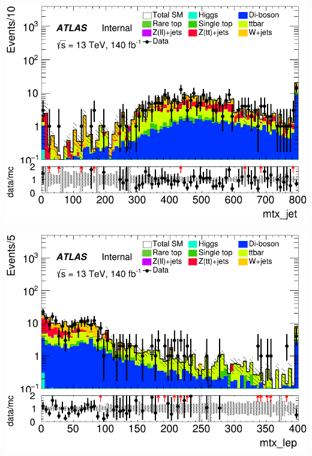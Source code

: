\documentclass[usenames,dvipsnames]{beamer}
\begin{document}
\begin{frame}
    \begin{minipage}{0.32\textwidth}
        \centering
        \includegraphics[width=\textwidth]{graphics/LHH_met/LHH_met_mtx_jet.png}
    \end{minipage}
        \hfill
    \begin{minipage}{0.32\textwidth}
        \centering
        \includegraphics[width=\textwidth]{graphics/LHH_met/LHH_met_mtx_lep.png}
    \end{minipage}
    \hfill
    \begin{minipage}{0.32\textwidth}
        \centering

\end{minipage}
\end{frame}
\end{document}
